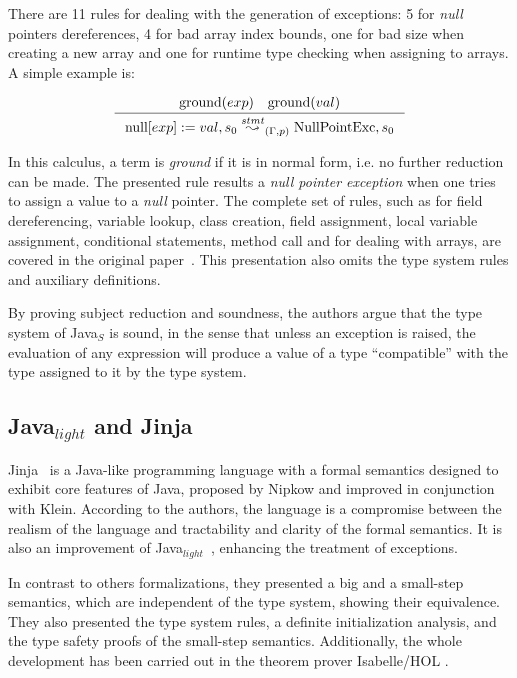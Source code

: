 \documentclass[tese,capa,english]{texufpel}
\begin{document}
There are 11 rules for dealing with the generation of exceptions: 5 for \emph{null} pointers dereferences, 4 for bad array index bounds, one for bad size when creating a new array and one for runtime type checking when assigning to arrays. A simple example is:

\[
	\begin{array}{c} 
	\inference{\textrm{ground}(exp) \ \ \ \textrm{ground}(val)}
	{\textrm{null}[exp] := val, s_0 \overset{stmt}{\leadsto}_{(\Gamma,p)} \textrm{NullPointExc},s_0}
	\end{array}
\]

In this calculus, a term is \emph{ground} if it is in normal form, i.e. no further reduction can be made. The presented rule results a \emph{null pointer exception} when one tries to assign a value to a \emph{null} pointer. The complete set of rules, such as for field dereferencing, variable lookup, class creation, field assignment, local variable assignment, conditional statements, method call and for dealing with arrays, are covered in the original paper~\cite{Drossopoulou97javais}. This presentation also omits the type system rules and auxiliary definitions.

By proving subject reduction and soundness, the authors argue that the type system of Java$_S$ is sound, in the sense that unless an exception is raised, the evaluation of any expression will produce a value of a type ``compatible'' with the type assigned to it by the type system.

\subsection{Java$_{light}$ and Jinja}
Jinja~\cite{Nipkow03jinja:towards,Klein:2006:MMJ:1146809.1146811} is a Java-like programming language with a formal semantics designed to exhibit core features of Java, proposed by Nipkow and improved in conjunction with Klein. According to the authors, the language is a compromise between the realism of the language and tractability and clarity of the formal semantics. It is also an improvement of Java$_{light}$~\cite{Nipkow:1998:JLT:268946.268960}, enhancing the treatment of exceptions. 

In contrast to others formalizations, they presented a big and a small-step semantics, which are independent of the type system, showing their equivalence. They also presented the type system rules, a definite initialization analysis, and the type safety proofs of the small-step semantics. Additionally, the whole development has been carried out in the theorem prover Isabelle/HOL \cite{jinja2017}.
\end{document}
